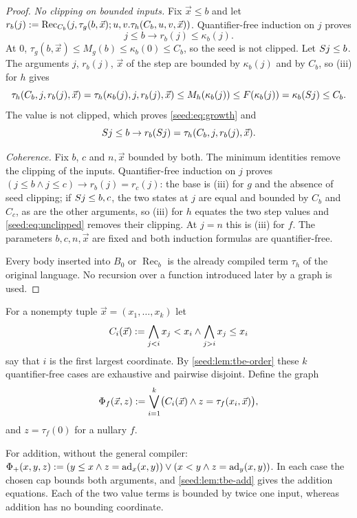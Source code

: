 \begin{proof}
\emph{No clipping on bounded inputs.} Fix $\vec x\leq b$ and let
$r_b(j)\mathrel{:=}\operatorname{Rec}_{C_b}(j,\tau_g(b,\vec x);
u,v.\tau_h(C_b,u,v,\vec x))$. Quantifier-free induction on $j$ proves
\begin{equation}\label{seed:eq:growth}
 j\leq b\to r_b(j)\leq\kappa_b(j).
\end{equation}
At $0$, $\tau_g(b,\vec x)\leq M_g(b)\leq\kappa_b(0)\leq C_b$, so the seed is
not clipped. Let $S j\leq b$. The arguments $j$, $r_b(j)$, $\vec x$ of the
step are bounded by $\kappa_b(j)$ and by $C_b$, so (iii) for $h$ gives
\[
 \tau_h(C_b,j,r_b(j),\vec x)=\tau_h(\kappa_b(j),j,r_b(j),\vec x)
 \leq M_h(\kappa_b(j))\leq F(\kappa_b(j))=\kappa_b(S j)\leq C_b .
\]
The value is not clipped, which proves \eqref{seed:eq:growth} and
\begin{equation}\label{seed:eq:unclipped}
 S j\leq b\to r_b(S j)=\tau_h(C_b,j,r_b(j),\vec x).
\end{equation}

\emph{Coherence.} Fix $b$, $c$ and $n,\vec x$ bounded by both. The minimum
identities remove the clipping of the inputs. Quantifier-free induction on
$j$ proves $(j\leq b\land j\leq c)\to r_b(j)=r_c(j)$: the base is (iii) for
$g$ and the absence of seed clipping; if $S j\leq b,c$, the two states at
$j$ are equal and bounded by $C_b$ and $C_c$, as are the other arguments, so
(iii) for $h$ equates the two step values and \eqref{seed:eq:unclipped}
removes their clipping. At $j=n$ this is (iii) for $f$. The parameters
$b,c,n,\vec x$ are fixed and both induction formulas are quantifier-free.

Every body inserted into $B_0$ or $\operatorname{Rec}_b$ is the already
compiled term $\tau_h$ of the original language. No recursion over a
function introduced later by a graph is used.
\end{proof}

For a nonempty tuple $\vec x=(x_1,\ldots,x_k)$ let
\[
 C_i(\vec x)\mathrel{:=}\bigwedge_{j<i}x_j<x_i\land\bigwedge_{j>i}x_j\leq x_i
\]
say that $i$ is the first largest coordinate. By \cref{seed:lem:tbe-order}
these $k$ quantifier-free cases are exhaustive and pairwise disjoint. Define
the graph
\begin{equation}\label{seed:eq:graph}
 \Phi_f(\vec x,z)\mathrel{:=}
 \bigvee_{i=1}^{k}\bigl(C_i(\vec x)\land z=\tau_f(x_i,\vec x)\bigr),
\end{equation}
and $z=\tau_f(0)$ for a nullary $f$.

\begin{example}
For addition, without the general compiler:
$\Phi_+(x,y,z)\mathrel{:=}(y\leq x\land z=\operatorname{ad}_x(x,y))\lor
(x<y\land z=\operatorname{ad}_y(x,y))$. In each case the chosen cap bounds
both arguments, and \cref{seed:lem:tbe-add} gives the addition equations.
Each of the two value terms is bounded by twice one input, whereas addition
has no bounding coordinate.
\end{example}

